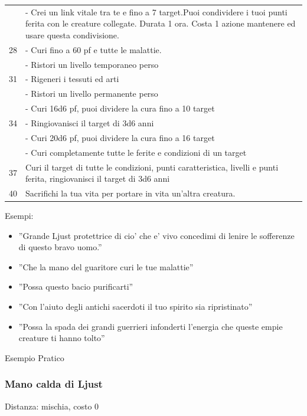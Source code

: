 \documentclass[a4paper,11pt,twoside,openany]{book}
\begin{document}
\begin{longtable}{L{3cm} L{13cm}}
		& - Crei un link vitale tra te e fino a 7 target.Puoi condividere i tuoi punti ferita con le creature collegate. Durata 1 ora. Costa 1 azione mantenere ed usare questa condivisione.\\
		28 &- Curi fino a 60 pf e tutte le malattie.\\
		& - Ristori un livello temporaneo perso\\
		31 & - Rigeneri i tessuti ed arti\\
		& - Ristori un livello permanente perso\\
		& - Curi 16d6 pf, puoi dividere la cura fino a 10 target\\
		34 & - Ringiovanisci il target di 3d6 anni\\
		& - Curi 20d6 pf, puoi dividere la cura fino a 16 target\\
		& - Curi completamente tutte le ferite e condizioni di un target\\
		37 & Curi il target di tutte le condizioni, punti caratteristica, livelli e punti ferita, ringiovanisci il target di 3d6 anni\\
		40 & Sacrifichi la tua vita per portare in vita un’altra creatura.\\
	\end{longtable}
	
	\bigskip
	
	
	Esempi:
	\begin{itemize}
		\item 
		''Grande Ljust protettrice di cio' che e' vivo concedimi di lenire
		le sofferenze di questo bravo uomo.'' 
		\item 
		''Che la mano del guaritore curi le tue malattie'' 
		\item 
		''Possa questo bacio purificarti'' 
		\item 
		''Con l'aiuto degli antichi sacerdoti il tuo spirito sia ripristinato'' 
		\item 
		''Possa la spada dei grandi guerrieri infonderti l'energia che queste empie creature ti hanno tolto'' 
	\end{itemize}
	
	\bigskip
	
	Esempio Pratico
	
	\subsubsection{Mano calda di Ljust}
	
	Distanza: mischia, costo 0
	
\end{document}
